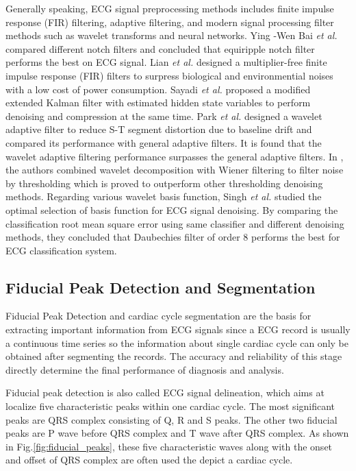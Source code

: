 Generally speaking, ECG signal preprocessing methods includes finite impulse response (FIR) filtering,   adaptive filtering, and modern signal processing filter methods such as wavelet transforms and neural networks. Ying -Wen Bai \textit{et al.} compared different notch filters and concluded that equiripple notch filter performs the best on ECG signal. Lian \textit{et al.} \cite{lian2004ecg} designed a multiplier-free finite impulse response (FIR) filters to surpress biological and environmential noises with a low cost of power consumption. Sayadi \textit{et al.} \cite{Sayadi} proposed a modified extended Kalman filter with estimated hidden state variables to perform denoising and compression at the same time. Park \textit{et al.}\cite{park1998application} designed a wavelet adaptive filter to reduce S-T segment distortion due to baseline drift and compared its performance with general adaptive filters. It is found that the wavelet adaptive filtering performance surpasses the general adaptive filters. In \cite{nikolaev2000wavelet}, the authors combined wavelet decomposition with Wiener filtering to filter noise by thresholding which is proved to outperform other thresholding denoising methods. Regarding various wavelet basis function, Singh \textit{et al.} studied the optimal selection of basis function for ECG signal denoising\cite{denoise}. By comparing the classification root mean square error using same classifier and different denoising methods, they concluded that Daubechies filter of order 8 performs the best for ECG classification system.


\subsection{Fiducial Peak Detection and Segmentation}\label{sec:fiducial_peaks}

Fiducial Peak Detection and cardiac cycle segmentation are the basis for extracting important information from ECG signals since a ECG record is usually a continuous time series so the information about single cardiac cycle can only be obtained after segmenting the records. The accuracy and reliability of this stage directly determine the final performance of diagnosis and analysis. 

Fiducial peak detection is also called ECG signal delineation, which aims at localize five characteristic peaks within one cardiac cycle. The most significant peaks are QRS complex consisting of Q, R and S peaks. The other two fiducial peaks are P wave before QRS complex and T wave after QRS complex. As shown in Fig.\ref{fig:fiducial_peaks}, these five characteristic waves along with the onset and offset of QRS complex are often used the depict a cardiac cycle.

